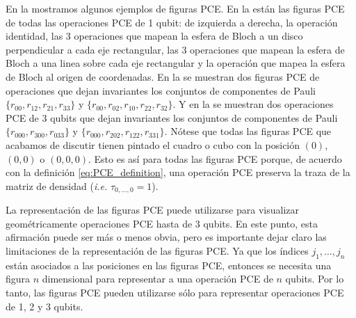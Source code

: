 
En la  mostramos algunos ejemplos de figuras PCE. 
En la  están las figuras PCE de todas 
las operaciones PCE de 1 qubit: de izquierda a derecha, la operación identidad, las 
3 operaciones que mapean la esfera de Bloch a un disco perpendicular a cada
eje rectangular, las 3 operaciones que mapean la esfera de Bloch a una linea
sobre cada eje rectangular y la operación que mapea la esfera 
de Bloch al origen de coordenadas. En la 
se muestran dos figuras PCE de operaciones que dejan invariantes
los conjuntos de componentes de Pauli $\{r_{00},r_{12},r_{21},r_{33}\}$ y 
$\{r_{00},r_{02},r_{10},r_{22},r_{32}\}$. Y en la 
 se muestran dos operaciones PCE de 3 qubits
que dejan invariantes los conjuntos de componentes de Pauli $\{r_{000},
r_{300}, r_{033}\}$ y $\{r_{000},r_{202},r_{122}, r_{331}\}$.
Nótese que todas las figuras PCE que acabamos de discutir  
tienen pintado el cuadro o cubo con la posición $(0)$, $(0,0)$ o $(0,0,0)$.
Esto es así para todas las figuras PCE porque, de acuerdo con la definición 
\eqref{eq:PCE_definition}, una operación PCE preserva la traza de 
la matriz de densidad (\textit{i.e.} $\tau_{0,\ldots,0}=1$).


La representación de las figuras PCE puede utilizarse para visualizar geométricamente 
operaciones PCE hasta de 3 qubits. En este punto, esta afirmación puede 
ser más o menos obvia, pero es importante dejar claro las limitaciones de 
la representación de las figuras PCE. 
Ya que los índices $j_1,\ldots,j_n$ están asociados a las posiciones 
en las figuras PCE, entonces se necesita una figura $n$ dimensional para representar 
a una operación PCE de $n$ qubits. Por lo tanto, las figuras PCE pueden
utilizarse sólo para representar operaciones PCE de 1, 2 y 3 qubits. 

